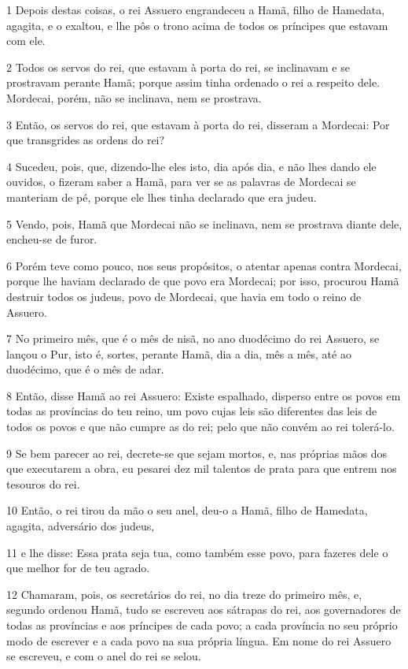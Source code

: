 \par 1 Depois destas coisas, o rei Assuero engrandeceu a Hamã, filho de Hamedata, agagita, e o exaltou, e lhe pôs o trono acima de todos os príncipes que estavam com ele.
\par 2 Todos os servos do rei, que estavam à porta do rei, se inclinavam e se prostravam perante Hamã; porque assim tinha ordenado o rei a respeito dele. Mordecai, porém, não se inclinava, nem se prostrava.
\par 3 Então, os servos do rei, que estavam à porta do rei, disseram a Mordecai: Por que transgrides as ordens do rei?
\par 4 Sucedeu, pois, que, dizendo-lhe eles isto, dia após dia, e não lhes dando ele ouvidos, o fizeram saber a Hamã, para ver se as palavras de Mordecai se manteriam de pé, porque ele lhes tinha declarado que era judeu.
\par 5 Vendo, pois, Hamã que Mordecai não se inclinava, nem se prostrava diante dele, encheu-se de furor.
\par 6 Porém teve como pouco, nos seus propósitos, o atentar apenas contra Mordecai, porque lhe haviam declarado de que povo era Mordecai; por isso, procurou Hamã destruir todos os judeus, povo de Mordecai, que havia em todo o reino de Assuero.
\par 7 No primeiro mês, que é o mês de nisã, no ano duodécimo do rei Assuero, se lançou o Pur, isto é, sortes, perante Hamã, dia a dia, mês a mês, até ao duodécimo, que é o mês de adar.
\par 8 Então, disse Hamã ao rei Assuero: Existe espalhado, disperso entre os povos em todas as províncias do teu reino, um povo cujas leis são diferentes das leis de todos os povos e que não cumpre as do rei; pelo que não convém ao rei tolerá-lo.
\par 9 Se bem parecer ao rei, decrete-se que sejam mortos, e, nas próprias mãos dos que executarem a obra, eu pesarei dez mil talentos de prata para que entrem nos tesouros do rei.
\par 10 Então, o rei tirou da mão o seu anel, deu-o a Hamã, filho de Hamedata, agagita, adversário dos judeus,
\par 11 e lhe disse: Essa prata seja tua, como também esse povo, para fazeres dele o que melhor for de teu agrado.
\par 12 Chamaram, pois, os secretários do rei, no dia treze do primeiro mês, e, segundo ordenou Hamã, tudo se escreveu aos sátrapas do rei, aos governadores de todas as províncias e aos príncipes de cada povo; a cada província no seu próprio modo de escrever e a cada povo na sua própria língua. Em nome do rei Assuero se escreveu, e com o anel do rei se selou.

